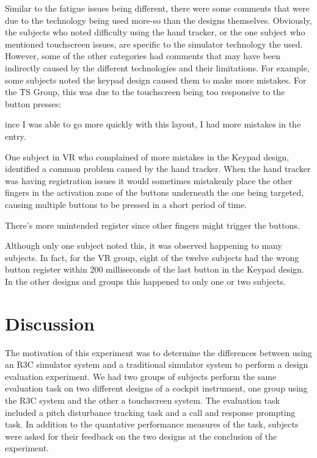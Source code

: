 Similar to the fatigue issues being different, there were some comments that were due to the technology being used more-so than the designs themselves.
Obviously, the subjects who noted difficulty using the hand tracker, or the one subject who mentioned touchscreen issues, are specific to the simulator technology the used.
However, some of the other categories had comments that may have been indirectly caused by the different technologies and their limitations.
For example, some subjects noted the keypad design caused them to make more mistakes.
For the TS Group, this was due to the touchscreen being too responsive to the button presses:
\begin{displayquote}[TS Subject]
    ince I was able to go more quickly with this layout, I had more mistakes in the entry.
\end{displayquote}
One subject in VR who complained of more mistakes in the Keypad design, identified a common problem caused by the hand tracker.
When the hand tracker was having registration issues it would sometimes mistakenly place the other fingers in the activation zone of the buttons underneath the one being targeted, causing multiple buttons to be pressed in a short period of time.
\begin{displayquote}[VR Subject]
    There's more unintended register since other fingers might trigger the buttons.
\end{displayquote}
Although only one subject noted this, it was observed happening to many subjects.
In fact, for the VR group, eight of the twelve subjects had the wrong button register within 200 milliseconds of the last button in the Keypad design.
In the other designs and groups this happened to only one or two subjects.


\section{Discussion}

The motivation of this experiment was to determine the differences between using an R3C simulator system and a traditional simulator system to perform a design evaluation experiment.
We had two groups of subjects perform the same evaluation task on two different designs of a cockpit instrument, one group using the R3C system and the other a touchscreen system.
The evaluation task included a pitch disturbance tracking task and a call and response prompting task.
In addition to the quantative performance measures of the task, subjects were asked for their feedback on the two designs at the conclusion of the experiment.

